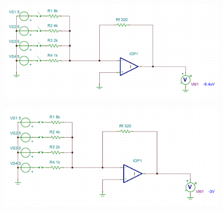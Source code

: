 \documentclass[%
reprint,
amsmath,amssymb,
aps,
floatfix
]{revtex4-2}
\begin{document}
		\begin{figure}
			\includegraphics[width=1.6\columnwidth]{circuitZero.png}
			\caption{\label{fig:ex27ResultsOff}}
		\end{figure}
		\begin{figure}
			\includegraphics[width=1.6\columnwidth]{circuitMax.png}
			\caption{\label{fig:ex27ResultsOn}}
		\end{figure}
		
	\clearpage
	
	\clearpage
	\onecolumngrid
	\appendix
\end{document}
